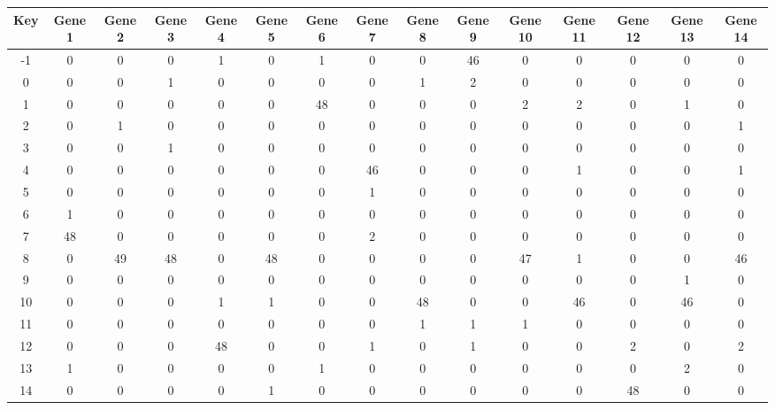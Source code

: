 \begin{tabular}{|c|c|c|c|c|c|c|c|c|c|c|c|c|c|c|}
\hline
Key & Gene 1 & Gene 2 & Gene 3 & Gene 4 & Gene 5 & Gene 6 & Gene 7 & Gene 8 & Gene 9 & Gene 10 & Gene 11 & Gene 12 & Gene 13 & Gene 14 \\
\hline
-1 & 0 & 0 & 0 & 1 & 0 & 1 & 0 & 0 & 46 & 0 & 0 & 0 & 0 & 0 \\
0 & 0 & 0 & 1 & 0 & 0 & 0 & 0 & 1 & 2 & 0 & 0 & 0 & 0 & 0 \\
1 & 0 & 0 & 0 & 0 & 0 & 48 & 0 & 0 & 0 & 2 & 2 & 0 & 1 & 0 \\
2 & 0 & 1 & 0 & 0 & 0 & 0 & 0 & 0 & 0 & 0 & 0 & 0 & 0 & 1 \\
3 & 0 & 0 & 1 & 0 & 0 & 0 & 0 & 0 & 0 & 0 & 0 & 0 & 0 & 0 \\
4 & 0 & 0 & 0 & 0 & 0 & 0 & 46 & 0 & 0 & 0 & 1 & 0 & 0 & 1 \\
5 & 0 & 0 & 0 & 0 & 0 & 0 & 1 & 0 & 0 & 0 & 0 & 0 & 0 & 0 \\
6 & 1 & 0 & 0 & 0 & 0 & 0 & 0 & 0 & 0 & 0 & 0 & 0 & 0 & 0 \\
7 & 48 & 0 & 0 & 0 & 0 & 0 & 2 & 0 & 0 & 0 & 0 & 0 & 0 & 0 \\
8 & 0 & 49 & 48 & 0 & 48 & 0 & 0 & 0 & 0 & 47 & 1 & 0 & 0 & 46 \\
9 & 0 & 0 & 0 & 0 & 0 & 0 & 0 & 0 & 0 & 0 & 0 & 0 & 1 & 0 \\
10 & 0 & 0 & 0 & 1 & 1 & 0 & 0 & 48 & 0 & 0 & 46 & 0 & 46 & 0 \\
11 & 0 & 0 & 0 & 0 & 0 & 0 & 0 & 1 & 1 & 1 & 0 & 0 & 0 & 0 \\
12 & 0 & 0 & 0 & 48 & 0 & 0 & 1 & 0 & 1 & 0 & 0 & 2 & 0 & 2 \\
13 & 1 & 0 & 0 & 0 & 0 & 1 & 0 & 0 & 0 & 0 & 0 & 0 & 2 & 0 \\
14 & 0 & 0 & 0 & 0 & 1 & 0 & 0 & 0 & 0 & 0 & 0 & 48 & 0 & 0 \\
\hline
\end{tabular}